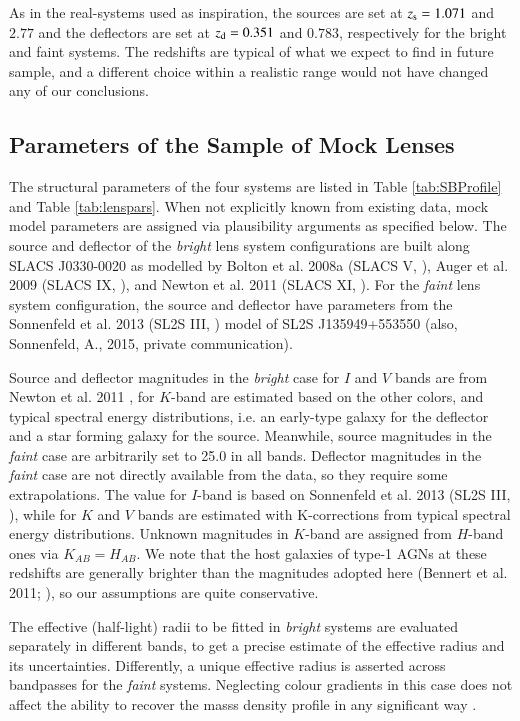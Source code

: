 \documentclass[a4paper,11pt]{article}
\begin{document}
As in the real-systems used as inspiration, the sources are set at
$z_{\rm s} = 1.071$ and $2.77$ and the deflectors are set at $z_{\rm d} = 0.351$
and $0.783$, respectively for the bright and faint systems. The
redshifts are typical of what we expect to find in future sample, and
a different choice within a realistic range would not have changed any
of our conclusions.


\subsection{Parameters of the Sample of Mock Lenses}

The structural parameters of the four systems are listed in Table
\ref{tab:SBProfile} and Table \ref{tab:lenspars}. When not explicitly known from existing data,
mock model parameters are assigned via plausibility arguments as
specified below. The source and deflector of the \textit{bright} lens
system configurations are built along SLACS J0330-0020 as modelled by
Bolton et al. 2008a (SLACS V, \cite{2008ApJ...682..964B}), Auger et
al. 2009 (SLACS IX, \cite{2009ApJ...705.1099A}), and Newton et
al. 2011 (SLACS XI, \cite{2011ApJ...734..104N}). For the
\textit{faint} lens system configuration, the source and deflector
have parameters from the Sonnenfeld et al. 2013 (SL2S III,
\cite{2013ApJ...777...97S}) model of SL2S J135949+553550
(also, Sonnenfeld, A., 2015, private communication).

Source and deflector magnitudes in the \textit{bright} case for $I$ and
$V$ bands are from Newton et al. 2011 \cite{2011ApJ...734..104N}, for
$K$-band are estimated based on the other colors, and typical spectral
energy distributions, i.e. an early-type galaxy for the deflector and
a star forming galaxy for the source. Meanwhile, source magnitudes in
the \textit{faint} case are arbitrarily set to 25.0 in all
bands. Deflector magnitudes in the \textit{faint} case are not
directly available from the data, so they require some
extrapolations. The value for $I$-band is based on Sonnenfeld et
al. 2013 (SL2S III,
\cite{2013ApJ...777...97S}), while for $K$ and $V$ bands are estimated
with K-corrections from typical spectral energy distributions. Unknown
magnitudes in $K$-band are assigned from $H$-band ones via
$K_{AB}=H_{AB}$. We note that the host galaxies of type-1 AGNs at
these redshifts are generally brighter than the magnitudes adopted
here (Bennert et al. 2011; \cite{2011ApJ...742..107B}), so our
assumptions are quite conservative.

The effective (half-light) radii to be fitted in \textit{bright}
systems are evaluated separately in different bands, to get a precise
estimate of the effective radius and its uncertainties. Differently, a
unique effective radius is asserted across bandpasses for the
\textit{faint} systems. Neglecting colour gradients in this case does
not affect the ability to recover the masss density profile in any
significant way
\cite{2013ApJ...777...97S}.
\end{document}
